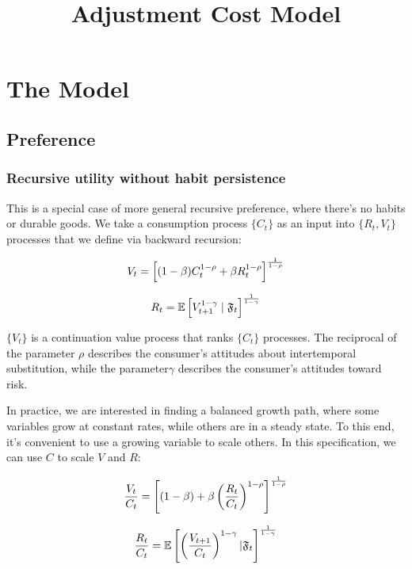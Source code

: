 \documentclass{article}
\title{Adjustment Cost Model}
\theoremstyle{exampstyle}
\begin{document}
\maketitle

\section{The Model}

\subsection{Preference}

\subsubsection{Recursive utility without habit persistence}
This is a special case of more general recursive preference, where there's no habits or durable goods. We take a consumption process $\{C_t\}$ as an input into $\{R_t, V_t\}$ processes that we define via backward recursion:

\begin{equation}\notag
V_t = \left[(1-\beta)C_t^{1-\rho}+\beta R_t^{1-\rho}\right]^{\frac{1}{1-\rho}}
\end{equation}

\begin{equation}\notag
R_t = \mathbb{E}\left[V_{t+1}^{1-\gamma} \mid {\mathfrak F}_t\right]^{\frac{1}{1-\gamma}}
\end{equation} 

$\{V_t\}$ is a continuation value process that ranks $\{C_t\}$ processes. The reciprocal of the parameter $\rho$ describes the consumer's attitudes about intertemporal substitution, while the parameter$\gamma$ describes the consumer's attitudes toward risk.

In practice, we are interested in finding a balanced growth path, where some variables grow at constant rates, while others are in a steady state. To this end, it's convenient to use a growing variable to scale others. In this specification, we can use $C$ to scale $V$ and $R$:

\begin{equation}\notag
\frac{V_t}{C_t} = \left[(1-\beta)+\beta\left(\frac{R_t}{C_t}\right)^{1-\rho}\right]^{\frac{1}{1-\rho}}
\end{equation}

\begin{equation}\notag
\frac{R_t}{C_t} = \mathbb{E}\left[\left(\frac{V_{t+1}}{C_t}\right)^{1-\gamma} | {\mathfrak F}_t\right]^{\frac{1}{1-\gamma}} 
\end{equation}
\end{document}
